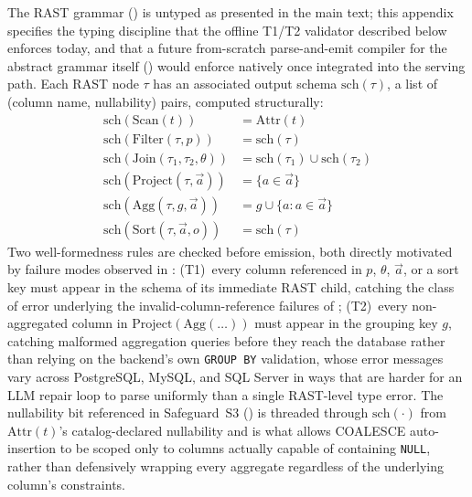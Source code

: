 \documentclass[twocolumn]{svjour3}
\begin{document}
The RAST grammar () is untyped as presented in the main text; this appendix specifies the typing discipline that the offline T1/T2 validator described below enforces today, and that a future from-scratch parse-and-emit compiler for the abstract grammar itself () would enforce natively once integrated into the serving path.
Each RAST node $\tau$ has an associated output schema $\text{sch}(\tau)$, a list of (column name, nullability) pairs, computed structurally:
\begin{align*}
\text{sch}(\text{Scan}(t)) &= \text{Attr}(t) \\
\text{sch}(\text{Filter}(\tau,p)) &= \text{sch}(\tau) \\
\text{sch}(\text{Join}(\tau_1,\tau_2,\theta)) &= \text{sch}(\tau_1) \cup \text{sch}(\tau_2) \\
\text{sch}(\text{Project}(\tau,\vec{a})) &= \{a \in \vec{a}\} \\
\text{sch}(\text{Agg}(\tau,g,\vec{a})) &= g \cup \{a : a \in \vec{a}\} \\
\text{sch}(\text{Sort}(\tau,\vec{a},o)) &= \text{sch}(\tau)
\end{align*}
Two well-formedness rules are checked before emission, both directly motivated by failure modes observed in : (T1)~every column referenced in $p$, $\theta$, $\vec{a}$, or a sort key must appear in the schema of its immediate RAST child, catching the class of error underlying the invalid-column-reference failures of ; (T2)~every non-aggregated column in $\text{Project}(\text{Agg}(\ldots))$ must appear in the grouping key $g$, catching malformed aggregation queries before they reach the database rather than relying on the backend's own \texttt{GROUP BY} validation, whose error messages vary across PostgreSQL, MySQL, and SQL Server in ways that are harder for an LLM repair loop to parse uniformly than a single RAST-level type error.
The nullability bit referenced in Safeguard~S3 () is threaded through $\text{sch}(\cdot)$ from $\text{Attr}(t)$'s catalog-declared nullability and is what allows COALESCE auto-insertion to be scoped only to columns actually capable of containing \texttt{NULL}, rather than defensively wrapping every aggregate regardless of the underlying column's constraints.
\end{document}
